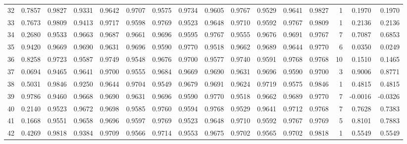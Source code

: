 \begin{tabular}{lrrrrrrrrrrrrrrr}
32  &      0.7857 &  0.9827 &  0.9331 &  0.9642 &  0.9707 &  0.9575 &  0.9734 &  0.9605 &  0.9767 &  0.9529 &   0.9641 &     0.9827 &      1 &                    0.1970 &                     0.1970 \\
33  &      0.7673 &  0.9809 &  0.9413 &  0.9717 &  0.9598 &  0.9769 &  0.9523 &  0.9648 &  0.9710 &  0.9592 &   0.9767 &     0.9809 &      1 &                    0.2136 &                     0.2136 \\
34  &      0.2680 &  0.9533 &  0.9663 &  0.9687 &  0.9661 &  0.9696 &  0.9595 &  0.9767 &  0.9555 &  0.9676 &   0.9691 &     0.9767 &      7 &                    0.7087 &                     0.6853 \\
35  &      0.9420 &  0.9669 &  0.9690 &  0.9631 &  0.9696 &  0.9590 &  0.9770 &  0.9518 &  0.9662 &  0.9689 &   0.9644 &     0.9770 &      6 &                    0.0350 &                     0.0249 \\
36  &      0.8258 &  0.9723 &  0.9587 &  0.9749 &  0.9548 &  0.9676 &  0.9700 &  0.9577 &  0.9740 &  0.9591 &   0.9768 &     0.9768 &     10 &                    0.1510 &                     0.1465 \\
37  &      0.0694 &  0.9465 &  0.9641 &  0.9700 &  0.9555 &  0.9684 &  0.9669 &  0.9690 &  0.9631 &  0.9696 &   0.9590 &     0.9700 &      3 &                    0.9006 &                     0.8771 \\
38  &      0.5031 &  0.9846 &  0.9250 &  0.9644 &  0.9704 &  0.9549 &  0.9679 &  0.9691 &  0.9624 &  0.9719 &   0.9575 &     0.9846 &      1 &                    0.4815 &                     0.4815 \\
39  &      0.9786 &  0.9460 &  0.9668 &  0.9690 &  0.9631 &  0.9696 &  0.9590 &  0.9770 &  0.9518 &  0.9662 &   0.9689 &     0.9770 &      7 &                   -0.0016 &                    -0.0326 \\
40  &      0.2140 &  0.9523 &  0.9672 &  0.9698 &  0.9585 &  0.9760 &  0.9594 &  0.9768 &  0.9529 &  0.9641 &   0.9712 &     0.9768 &      7 &                    0.7628 &                     0.7383 \\
41  &      0.1668 &  0.9551 &  0.9658 &  0.9696 &  0.9597 &  0.9769 &  0.9523 &  0.9648 &  0.9710 &  0.9592 &   0.9767 &     0.9769 &      5 &                    0.8101 &                     0.7883 \\
42  &      0.4269 &  0.9818 &  0.9384 &  0.9709 &  0.9566 &  0.9714 &  0.9553 &  0.9675 &  0.9702 &  0.9565 &   0.9702 &     0.9818 &      1 &                    0.5549 &                     0.5549 \\

\end{tabular}
